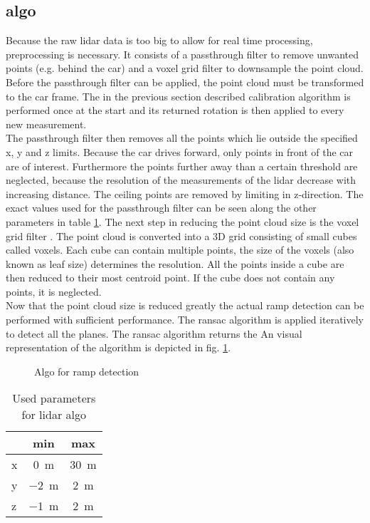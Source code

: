 \subsection{algo}
Because the raw \acrshort{lidar} data is too big to allow for real time processing, preprocessing is necessary.
It consists of a passthrough filter to remove unwanted points (e.g. behind the car) and a voxel grid filter to downsample the point cloud.
Before the passthrough filter can be applied, the point cloud must be transformed to the car frame.
The in the previous section described calibration algorithm is performed once at the start and its returned rotation is then applied to every new measurement.\\
The passthrough filter then removes all the points which lie outside the specified x, y and z limits.
Because the car drives forward, only points in front of the car are of interest.
Furthermore the points further away than a certain threshold are neglected, because the resolution of the measurements of the \acrshort{lidar} decrease with increasing distance.
The ceiling points are removed by limiting in z-direction.
The exact values used for the passthrough filter can be seen along the other parameters in table \ref{tab:lidar_params}.
The next step in reducing the point cloud size is the voxel grid filter \cite{Vosselman2004}.
The point cloud is converted into a 3D grid consisting of small cubes called voxels.
Each cube can contain multiple points, the size of the voxels (also known as leaf size) determines the resolution.
All the points inside a cube are then reduced to their most centroid point.
If the cube does not contain any points, it is neglected.\\
Now that the point cloud size is reduced greatly the actual ramp detection can be performed with sufficient performance.
The \acrshort{ransac} algorithm is applied iteratively to detect all the planes.
The \acrshort{ransac} algorithm returns the
An visual representation of the algorithm is depicted in fig. \ref{fig:flowchart_lidar}.
\begin{figure}[htb]
    \centering
    
    \caption{Algo for ramp detection}
    \label{fig:flowchart_lidar}
\end{figure}

\begin{table}[ht]
	\centering
	\caption{Used parameters for lidar algo}
	\label{tab:lidar_params}
	\begin{tabular}[t]{lcc}
	\toprule
	&\textbf{min} & \textbf{max}\\
	\midrule
	x 				& \SI{0}{\metre}	& \SI{30}{\metre}\\
    y 				& \SI{-2}{\metre}  & \SI{2}{\metre}\\
	z			    & \SI{-1}{\metre}  & \SI{2}{\metre}\\
	\bottomrule
	\end{tabular}
\end{table}%



